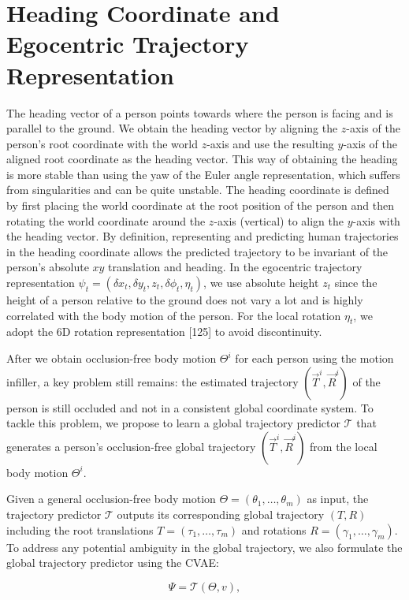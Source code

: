 

\section*{Heading Coordinate and Egocentric Trajectory Representation}

The heading vector of a person points towards where the person is facing and is parallel to the ground. We obtain the heading vector by aligning the $z$-axis of the person's root coordinate with the world $z$-axis and use the resulting $y$-axis of the aligned root coordinate as the heading vector. This way of obtaining the heading is more stable than using the yaw of the Euler angle representation, which suffers from singularities and can be quite unstable. The heading coordinate is defined by first placing the world coordinate at the root position of the person and then rotating the world coordinate around the $z$-axis (vertical) to align the $y$-axis with the heading vector. By definition, representing and predicting human trajectories in the heading coordinate allows the predicted trajectory to be invariant of the person's absolute $xy$ translation and heading. In the egocentric trajectory representation $\psi_t = (\delta x_t, \delta y_t, z_t, \delta\phi_t, \eta_t)$, we use absolute height $z_t$ since the height of a person relative to the ground does not vary a lot and is highly correlated with the body motion of the person. For the local rotation $\eta_t$, we adopt the 6D rotation representation [125] to avoid discontinuity.

After we obtain occlusion-free body motion $\Theta^i$ for each person using the motion infiller, a key problem still remains: the estimated trajectory $(\vec{T}^i, \vec{R}^i)$ of the person is still occluded and not in a consistent global coordinate system. To tackle this problem, we propose to learn a global trajectory predictor $\mathcal{T}$ that generates a person's occlusion-free global trajectory $(\vec{T}^i, \vec{R}^i)$ from the local body motion $\Theta^i$.

Given a general occlusion-free body motion $\Theta = (\theta_1,\ldots,\theta_m)$ as input, the trajectory predictor $\mathcal{T}$ outputs its corresponding global trajectory $(T, R)$ including the root translations $T = (\tau_1,\ldots,\tau_m)$ and rotations $R = (\gamma_1,\ldots,\gamma_m)$. To address any potential ambiguity in the global trajectory, we also formulate the global trajectory predictor using the CVAE:

\begin{equation}
\Psi = \mathcal{T}(\Theta,v), \tag{3}
\end{equation}

